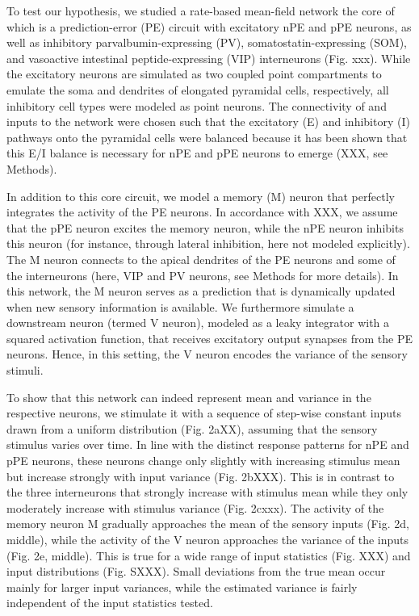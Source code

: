 \documentclass[10pt,a4paper,draft]{article}
\begin{document}
To test our hypothesis, we studied a rate-based mean-field network the core of which is a prediction-error (PE) circuit with excitatory nPE and pPE neurons, as well as inhibitory parvalbumin-expressing (PV), somatostatin-expressing (SOM), and vasoactive intestinal peptide-expressing (VIP) interneurons (Fig. xxx). While the excitatory neurons are simulated as two coupled point compartments to emulate the soma and dendrites of elongated pyramidal cells, respectively, all inhibitory cell types were modeled as point neurons. The connectivity of and inputs to the network were chosen such that the excitatory (E) and inhibitory (I) pathways onto the pyramidal cells were balanced because it has been shown that this E/I balance is necessary for nPE and pPE neurons to emerge (XXX, see Methods). 

In addition to this core circuit, we model a memory (M) neuron that perfectly integrates the activity of the PE neurons. In accordance with XXX, we assume that the pPE neuron excites the memory neuron, while the nPE neuron inhibits this neuron (for instance, through lateral inhibition, here not modeled explicitly). The M neuron connects to the apical dendrites of the PE neurons and some of the interneurons (here, VIP and PV neurons, see Methods for more details). In this network, the M neuron serves as a prediction that is dynamically updated when new sensory information is available. We furthermore simulate a downstream neuron (termed V neuron), modeled as a leaky integrator with a squared activation function, that receives excitatory output synapses from the PE neurons. Hence, in this setting, the V neuron encodes the variance of the sensory stimuli. 

To show that this network can indeed represent mean and variance in the respective neurons, we stimulate it with a sequence of step-wise constant inputs drawn from a uniform distribution (Fig. 2aXX), assuming that the sensory stimulus varies over time. In line with the distinct response patterns for nPE and pPE neurons, these neurons change only slightly with increasing stimulus mean but increase strongly with input variance (Fig. 2bXXX). This is in contrast to the three interneurons that strongly increase with stimulus mean while they only moderately increase with stimulus variance (Fig. 2cxxx). The activity of the memory neuron M gradually approaches the mean of the sensory inputs (Fig. 2d, middle), while the activity of the V neuron approaches the variance of the inputs (Fig. 2e, middle). This is true for a wide range of input statistics (Fig. XXX) and input distributions (Fig. SXXX). Small deviations from the true mean occur mainly for larger input variances, while the estimated variance is fairly independent of the input statistics tested. 
\end{document}
